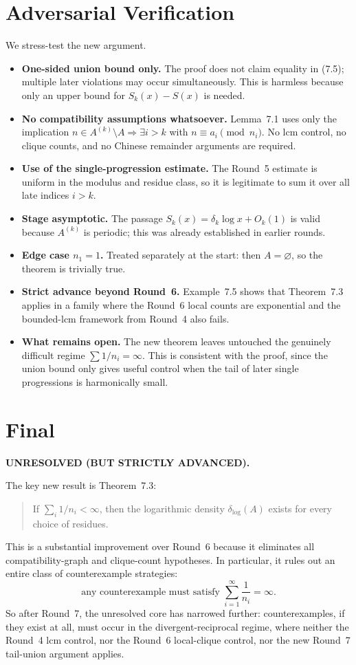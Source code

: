 \section{Adversarial Verification}
We stress-test the new argument.
\begin{itemize}
\item \textbf{One-sided union bound only.}  The proof does not claim equality in (7.5); multiple later violations may
occur simultaneously.  This is harmless because only an upper bound for \(S_k(x)-S(x)\) is needed.
\item \textbf{No compatibility assumptions whatsoever.}  Lemma~7.1 uses only the implication
\(n\in A^{(k)}\setminus A\Rightarrow\exists i>k\) with \(n\equiv a_i\pmod{n_i}\).  No lcm control, no clique counts, and no
Chinese remainder arguments are required.
\item \textbf{Use of the single-progression estimate.}  The Round~5 estimate is uniform in the modulus and residue class, so it
is legitimate to sum it over all late indices \(i>k\).
\item \textbf{Stage asymptotic.}  The passage \(S_k(x)=\delta_k\log x+O_k(1)\) is valid because \(A^{(k)}\) is periodic; this was
already established in earlier rounds.
\item \textbf{Edge case \(n_1=1\).}  Treated separately at the start: then \(A=\varnothing\), so the theorem is trivially true.
\item \textbf{Strict advance beyond Round~6.}  Example~7.5 shows that Theorem~7.3 applies in a family where the Round~6 local
counts are exponential and the bounded-lcm framework from Round~4 also fails.
\item \textbf{What remains open.}  The new theorem leaves untouched the genuinely difficult regime
\(\sum 1/n_i=\infty\).  This is consistent with the proof, since the union bound only gives useful control when the tail of
later single progressions is harmonically small.
\end{itemize}

\section{Final}
\textbf{UNRESOLVED (BUT STRICTLY ADVANCED).}

The key new result is Theorem~7.3:
\begin{quote}
If \(\sum_i 1/n_i<\infty\), then the logarithmic density \(\delta_{\log}(A)\) exists for every choice of residues.
\end{quote}
This is a substantial improvement over Round~6 because it eliminates all compatibility-graph and clique-count hypotheses.
In particular, it rules out an entire class of counterexample strategies:
\begin{equation}
\text{any counterexample must satisfy }\sum_{i=1}^{\infty}\frac1{n_i}=\infty.
\tag{7.20}
\end{equation}
So after Round~7, the unresolved core has narrowed further:
counterexamples, if they exist at all, must occur in the divergent-reciprocal regime, where neither the Round~4 lcm
control, nor the Round~6 local-clique control, nor the new Round~7 tail-union argument applies.

